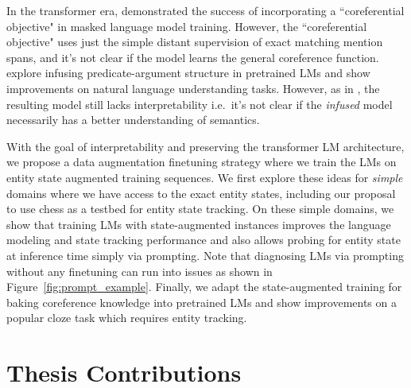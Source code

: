 \documentclass[12pt]{thesis-umich}[thesis]
\begin{document}
In the transformer era, \citet{ye-etal-2020-coreferential} demonstrated the success of incorporating a ``coreferential objective" in masked language model training.
However, the ``coreferential objective" uses just the simple distant supervision of exact matching mention spans, and it's not clear if the model learns the general coreference function.  
\citet{wu2021infusing} explore infusing predicate-argument structure in pretrained LMs and show improvements on natural language understanding tasks. However, as in \citet{ye-etal-2020-coreferential}, the resulting model still lacks interpretability i.e.\ it's not clear if the \emph{infused} model necessarily has a better understanding of semantics. 




With the goal of interpretability and preserving the transformer LM architecture, we propose a data augmentation finetuning strategy where we train the LMs on entity state augmented training sequences. 
We first explore these ideas for \emph{simple} domains where we have access to the exact entity states, including our proposal to use chess as a testbed for entity state tracking.  
On these simple domains, we show that training LMs with state-augmented instances improves the language modeling  and state tracking performance and also allows probing for entity state at inference time simply via prompting. Note that diagnosing LMs via prompting without any finetuning can run into issues as shown in Figure~\ref{fig:prompt_example}. Finally, we adapt the state-augmented training for baking coreference knowledge into pretrained LMs and show improvements on a popular cloze task which requires entity tracking.




















 








\section{Thesis Contributions}
\label{sec:thesis_contributions}
\end{document}
